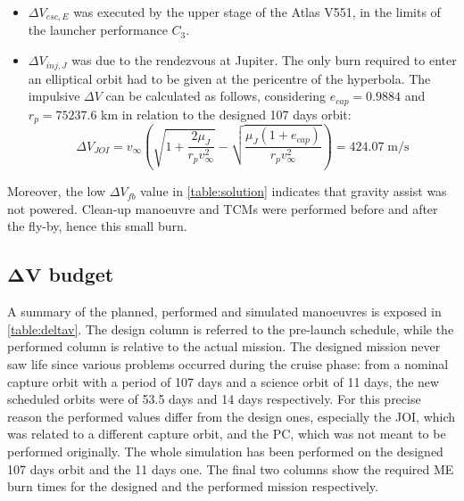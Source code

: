 \begin{itemize}
    \item $\Delta V_{esc,E}$ was executed by the upper stage of the Atlas V551, in the limits of the launcher performance $C_3$.
    \item $\Delta V_{inj,J}$ was due to the rendezvous at Jupiter. The only burn required to enter an elliptical orbit had to be given at the pericentre of the hyperbola. The impulsive $\Delta V$ can be calculated as follows, considering $e_{cap} = 0.9884$ and $r_p = 75237.6$ km in relation to the designed 107 days orbit: 
    \begin{equation}
        \Delta V_{JOI} = v_{\infty} \left( \sqrt{1 + \frac{2\mu_{J}}{r_p v_{\infty}^2}} - \sqrt{\frac{\mu_{J} (1 + e_{cap})}{r_p v_{\infty}^2}}\right) =  424.07 \; \textrm{m/s}
    \end{equation}
\end{itemize}
Moreover, the low $\Delta V_{fb}$ value in \autoref{table:solution} indicates that gravity assist was not powered. Clean-up manoeuvre and TCMs were performed before and after the fly-by, hence this small burn.

\subsection
[\texorpdfstring{$\Delta V$}{Delta-V} budget]
{\texorpdfstring{$\boldsymbol{\Delta V}$}{Delta-V} budget}
\label{subsec:deltav_budget}

A summary of the planned, performed and simulated manoeuvres is exposed in \autoref{table:deltav}. The design column is referred to the pre-launch schedule, while the performed column is relative to the actual mission.
The designed mission never saw life since various problems occurred during the cruise phase: from a nominal capture orbit with a period of 107 days and a science orbit of 11 days, the new scheduled orbits were of 53.5 days and 14 days respectively.
For this precise reason the performed values differ from the design ones, especially the JOI, which was related to a different capture orbit, and the PC, which was not meant to be performed originally. The whole simulation has been performed on the designed 107 days orbit and the 11 days one. The final two columns show the required ME burn times for the designed and the performed mission respectively.

